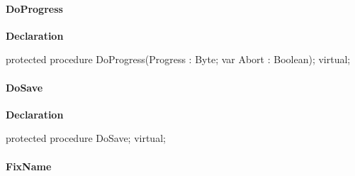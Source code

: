 \documentclass{report}
\newif\ifpdf
\begin{document}
\paragraph*{DoProgress}\hspace*{\fill}

\label{AbArcTyp.TAbArchive-DoProgress}
\begin{list}{}{
\setlength{\itemindent}{0cm}
\setlength{\listparindent}{0cm}
\setlength{\leftmargin}{\evensidemargin}
\addtolength{\leftmargin}{\tmplength}
\settowidth{\labelsep}{X}
\addtolength{\leftmargin}{\labelsep}
\setlength{\labelwidth}{\tmplength}
}
\item[\textbf{Declaration}\hfill]
\ifpdf
\begin{flushleft}
\fi
\begin{ttfamily}
protected procedure DoProgress(Progress : Byte; var Abort : Boolean); virtual;\end{ttfamily}

\ifpdf
\end{flushleft}
\fi

\end{list}
\paragraph*{DoSave}\hspace*{\fill}

\label{AbArcTyp.TAbArchive-DoSave}
\begin{list}{}{
\setlength{\itemindent}{0cm}
\setlength{\listparindent}{0cm}
\setlength{\leftmargin}{\evensidemargin}
\addtolength{\leftmargin}{\tmplength}
\settowidth{\labelsep}{X}
\addtolength{\leftmargin}{\labelsep}
\setlength{\labelwidth}{\tmplength}
}
\item[\textbf{Declaration}\hfill]
\ifpdf
\begin{flushleft}
\fi
\begin{ttfamily}
protected procedure DoSave; virtual;\end{ttfamily}

\ifpdf
\end{flushleft}
\fi

\end{list}
\paragraph*{FixName}\hspace*{\fill}
\end{document}
